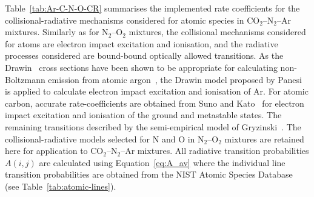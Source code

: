 {Table~\ref{tab:Ar-C-N-O-CR} summarises the implemented rate coefficients for the collisional-radiative mechanisms considered for atomic species in CO$_2$--N$_2$--Ar mixtures.
Similarly as for N$_2$--O$_2$ mixtures, the collisional mechanisms considered for atoms are electron impact excitation and ionisation, and the radiative processes considered are bound-bound optically allowed transitions.
As the Drawin~\cite{drawin_1968} cross sections have been shown to be appropriate for calculating non-Boltzmann emission from atomic argon~\cite{Vlcek1989, BGV1998}, the Drawin model proposed by Panesi~\cite{panesi_phd} is applied to calculate electron impact excitation and ionisation of Ar.
For atomic carbon, accurate rate-coefficients are obtained from Suno and Kato~\cite{SK2006} for electron impact excitation and ionisation of the ground and metastable states.
The remaining transitions described by the semi-empirical model of Gryzinski~\cite{Gryz59}.
The collisional-radiative models selected for N and O in N$_2$--O$_2$ mixtures are retained here for application to CO$_2$--N$_2$--Ar mixtures.
All radiative transition probabilities $A(i,j)$ are calculated using Equation~\ref{eq:A_av} where the individual line transition probabilities are obtained from the NIST Atomic Species Database~\cite{NIST_ASD} (see Table~\ref{tab:atomic-lines}).

}
